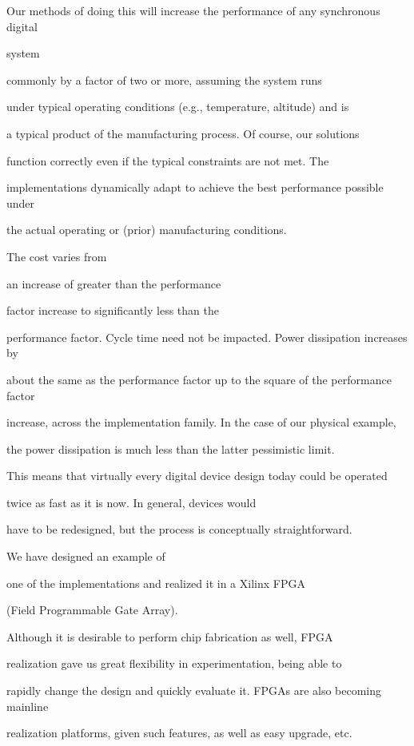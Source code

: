 \documentclass[12pt,dvips]{article}
\begin{document}
Our methods of doing this will increase the performance of any synchronous digital

system

commonly by a factor of two or more, assuming the system runs

under typical operating conditions (e.g., temperature, altitude) and is

a typical product of the manufacturing process. Of course, our solutions

function correctly even if the typical constraints are not met. The

implementations dynamically adapt to achieve the best performance possible under

the actual operating or (prior) manufacturing conditions.

The cost varies from

an increase of greater than the performance

factor increase to significantly less than the

performance factor. Cycle time need not be impacted. Power dissipation increases by

about the same as the performance factor up to the square of the performance factor

increase, across the implementation family. In the case of our physical example,

the power dissipation is much less than the latter pessimistic limit.



This means that virtually every digital device design today could be operated

twice as fast as it is now. In general, devices would

have to be redesigned, but the process is conceptually straightforward.



We have designed an example of

one of the implementations and realized it in a Xilinx FPGA

(Field Programmable Gate Array).

Although it is desirable to perform chip fabrication as well, FPGA

realization gave us great flexibility in experimentation, being able to

rapidly change the design and quickly evaluate it. FPGAs are also becoming mainline

realization platforms, given such features, as well as easy upgrade, etc.
\end{document}
